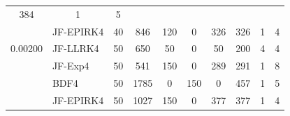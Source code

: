 \begin{table}
\begin{adjustbox}{width=0.9\columnwidth,center}
\begin{tabular}{cccccccccc}
			384 & 1 & 5 \\
			\multicolumn{1}{l}{} & \multicolumn{1}{l}{JF-EPIRK4} & 40 & 846 & 120 & 0 &
			326 & 326 & 1 & 4 \\
			\multicolumn{1}{l}{0.00200} & \multicolumn{1}{l}{JF-LLRK4} & 50 & 650 & 50
			& 0 & 50 & 200 & 4 & 4 \\
			\multicolumn{1}{l}{} & \multicolumn{1}{l}{JF-Exp4} & 50 & 541 & 150 & 0 & 289
			& 291 & 1 & 8 \\
			\multicolumn{1}{l}{} & \multicolumn{1}{l}{BDF4} & 50 & 1785 & 0 & 150 & 0 &
			457 & 1 & 5 \\
			\multicolumn{1}{l}{} & \multicolumn{1}{l}{JF-EPIRK4} & 50 & 1027 & 150 & 0 &
			377 & 377 & 1 & 4 \\
			\hline
		\end{tabular}
	\end{adjustbox}
	\label{tab:br2d}
\end{table}

